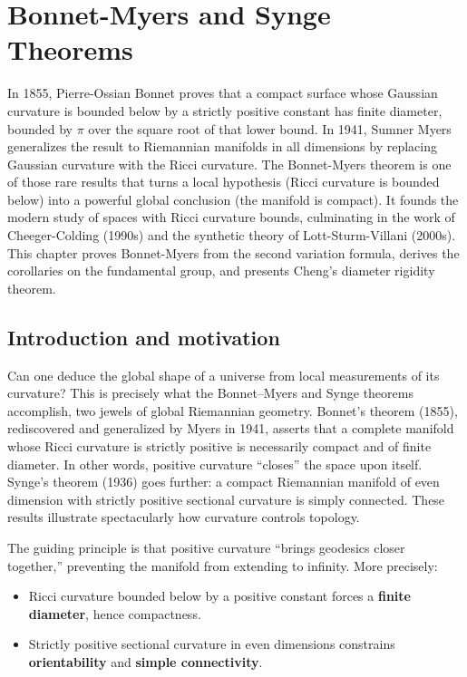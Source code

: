 \chapter{Bonnet-Myers and Synge Theorems}
\label{ch:bonnet_myers}

In 1855, Pierre-Ossian Bonnet proves that a compact surface whose Gaussian curvature is bounded below by a strictly positive constant has finite diameter, bounded by $\pi$ over the square root of that lower bound. In 1941, Sumner Myers generalizes the result to Riemannian manifolds in all dimensions by replacing Gaussian curvature with the Ricci curvature. The Bonnet-Myers theorem is one of those rare results that turns a local hypothesis (Ricci curvature is bounded below) into a powerful global conclusion (the manifold is compact). It founds the modern study of spaces with Ricci curvature bounds, culminating in the work of Cheeger-Colding (1990s) and the synthetic theory of Lott-Sturm-Villani (2000s). This chapter proves Bonnet-Myers from the second variation formula, derives the corollaries on the fundamental group, and presents Cheng's diameter rigidity theorem.

\section{Introduction and motivation}

Can one deduce the global shape of a universe from local measurements of its curvature? This is precisely what the Bonnet--Myers and Synge theorems accomplish, two jewels of global Riemannian geometry. Bonnet's theorem (1855), rediscovered and generalized by Myers in 1941, asserts that a complete manifold whose Ricci curvature is strictly positive is necessarily compact and of finite diameter. In other words, positive curvature ``closes'' the space upon itself. Synge's theorem (1936) goes further: a compact Riemannian manifold of even dimension with strictly positive sectional curvature is simply connected. These results illustrate spectacularly how curvature controls topology.

\begin{intuition}
The guiding principle is that positive curvature ``brings geodesics closer
together,'' preventing the manifold from extending to infinity. More precisely:
\begin{itemize}
    \item Ricci curvature bounded below by a positive constant forces a
          \textbf{finite diameter}, hence compactness.
    \item Strictly positive sectional curvature in even dimensions constrains
          \textbf{orientability} and \textbf{simple connectivity}.
\end{itemize}
\end{intuition}

